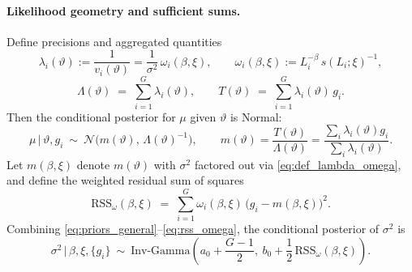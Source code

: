 \paragraph{Likelihood geometry and sufficient sums.}
Define precisions and aggregated quantities
\begin{equation}
  \lambda_i(\vartheta) := \frac{1}{v_i(\vartheta)} = \frac{1}{\sigma^2}\,\omega_i(\beta,\xi),
  \qquad
  \omega_i(\beta,\xi) := L_i^{-\beta}\,s(L_i;\xi)^{-1},
  \label{eq:def_lambda_omega}
\end{equation}
\begin{equation}
  \Lambda(\vartheta) \;=\; \sum_{i=1}^G \lambda_i(\vartheta),\qquad
  T(\vartheta) \;=\; \sum_{i=1}^G \lambda_i(\vartheta)\,g_i.
  \label{eq:Lambda_T}
\end{equation}
Then the conditional posterior for $\mu$ given $\vartheta$ is Normal:
\begin{equation}
  \mu\,\big|\,\vartheta, g_i \ \sim\ \mathcal{N}\!\big(m(\vartheta),\,\Lambda(\vartheta)^{-1}\big),
  \qquad
  m(\vartheta)=\frac{T(\vartheta)}{\Lambda(\vartheta)}=\frac{\sum_i \lambda_i(\vartheta) g_i}{\sum_i \lambda_i(\vartheta)}.
  \label{eq:mu_conditional}
\end{equation}
Let $m(\beta,\xi)$ denote $m(\vartheta)$ with $\sigma^2$ factored out via \eqref{eq:def_lambda_omega}, and define the weighted residual sum of squares
\begin{equation}
  \mathrm{RSS}_\omega(\beta,\xi) \;=\; \sum_{i=1}^G \omega_i(\beta,\xi)\,\big(g_i - m(\beta,\xi)\big)^2.
  \label{eq:rss_omega}
\end{equation}
Combining \eqref{eq:priors_general}--\eqref{eq:rss_omega}, the conditional posterior of $\sigma^2$ is
\begin{equation}
  \sigma^2 \,\big|\, \beta,\xi,\{g_i\} \ \sim\ \mathrm{Inv\text{-}Gamma}\!\left(a_0+\frac{G-1}{2},\ b_0+\frac{1}{2}\,\mathrm{RSS}_\omega(\beta,\xi)\right).
  \label{eq:sigma2_posterior}
\end{equation}


